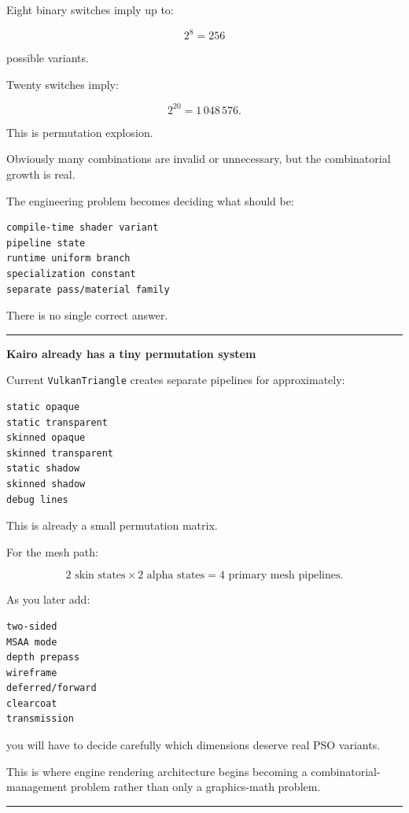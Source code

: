 Eight binary switches imply up to:

\[
2^8=256
\]

possible variants.

Twenty switches imply:

\[
2^{20}=1\,048\,576.
\]

This is permutation explosion.

Obviously many combinations are invalid or unnecessary, but the combinatorial growth is real.

The engineering problem becomes deciding what should be:

\begin{verbatim}
compile-time shader variant
pipeline state
runtime uniform branch
specialization constant
separate pass/material family
\end{verbatim}

There is no single correct answer.

\begin{center}\rule{0.5\linewidth}{0.5pt}\end{center}

\textbf{Kairo already has a tiny permutation system}

Current \texttt{VulkanTriangle} creates separate pipelines for approximately:

\begin{verbatim}
static opaque
static transparent
skinned opaque
skinned transparent
static shadow
skinned shadow
debug lines
\end{verbatim}

This is already a small permutation matrix.

For the mesh path:

\[
2\text{ skin states}
\times
2\text{ alpha states}
=
4\text{ primary mesh pipelines}.
\]

As you later add:

\begin{verbatim}
two-sided
MSAA mode
depth prepass
wireframe
deferred/forward
clearcoat
transmission
\end{verbatim}

you will have to decide carefully which dimensions deserve real PSO variants.

This is where engine rendering architecture begins becoming a combinatorial-management problem rather than only a graphics-math problem.

\begin{center}\rule{0.5\linewidth}{0.5pt}\end{center}

